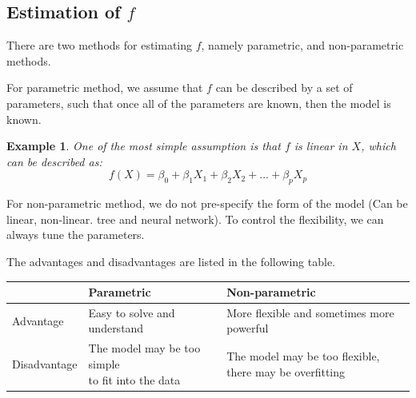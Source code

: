 \documentclass{article}
\theoremstyle{MyNonumberplain}
\theoremstyle{break}
\theoremstyle{break}
\newtheorem{example}{Example}[section]
\theoremstyle{break}
\theoremstyle{break}
\begin{document}
\subsection{Estimation of $f$}

There are two methods for estimating $f$, namely parametric, and non-parametric methods.

For parametric method, we assume that $f$ can be described by a set of parameters, such that once all of the parameters are known, then the model is known.

\begin{expbox}
    \begin{example}
        One of the most simple assumption is that $f$ is linear in $X$, which can be described as:  $$f(X)=\beta_0+\beta_1X_1+\beta_2X_2+...+\beta_pX_p$$
    \end{example}
\end{expbox}

For non-parametric method, we do not pre-specify the form of the model (Can be linear, non-linear. tree and neural network). To 
control the flexibility, we can always tune the parameters.

The advantages and disadvantages are listed in the following table.

\begin{table}[!h]
    \centering
    \begin{tabular}{|l|l|l|}
    \hline
                    & Parametric                                       & Non-parametric                                          \\ \hline
    Advantage    & Easy to solve and understand                     & More flexible and sometimes more powerful               \\ \hline
    Disadvantage & \makecell{The model may be too simple\\ to fit into the data} & \makecell{The model may be too flexible, \\there may be overfitting} \\ \hline
    \end{tabular}
\end{table}
\end{document}
